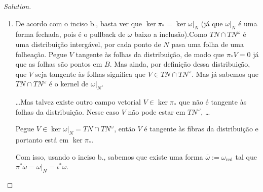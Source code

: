 \begin{proof}[Solution]
\begin{enumerate}[label=\alph*.]
	\item De acordo com o inciso b., basta ver que $\ker \pi_*=\ker \omega|_{N}$ (já que $\omega|_{N}$ é uma forma fechada, pois é o pullback de $\omega$ baixo a inclusão).Como $TN\cap TN^\omega$ é uma distribuição intergável, por cada ponto de $N$ pasa uma folha de uma folheação. Pegue $V$ tangente às folhas da distribuição, de modo que  $\pi_*V=0$ já que as folhas são pontos em $B$. Mas ainda, por definição dessa distribuição, que $V$ seja tangente às folhas significa que $V\in TN\cap TN^\omega$. Mas já sabemos que $TN\cap TN^{\omega}$ é o kernel de $\omega|_{N}$.

		{\color{5}…Mas talvez existe outro campo vetorial $V\in\ker\pi_*$ que não é tangente às folhas da distribuição. Nesse caso $V$  não pode estar em $TN^\omega$, …}

		Pegue $V\in\ker \omega |_{N}=TN\cap TN^\omega$, então $V$ é tangente às fibras da distribuição e portanto está em $\ker \pi_*$.

		Com isso, usando o inciso b., sabemos que existe uma forma  $\overline{\omega}:=\omega_{\operatorname{red}}$ tal que $\pi^*\overline{\omega}=\omega|_{N}=\iota^*\omega$.

\end{enumerate}	
\end{proof}


